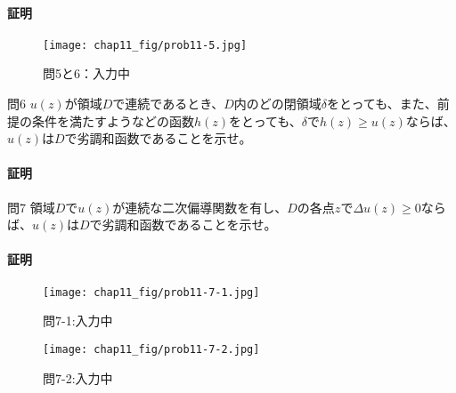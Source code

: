 \paragraph{証明}
\begin{figure}[h]
    \centering
    \texttt{[image: chap11\_fig/prob11-5.jpg]}
    \caption{問5と6：入力中}
    \label{fig:chap11_5}
\end{figure}

\newpage
\begin{mysimplebox}{問6}
    $u(z)$が領域$D$で連続であるとき、$D$内のどの閉領域$\delta$をとっても、また、前提の条件を満たすようなどの函数$h(z)$をとっても、$\delta$で$h(z)\ge u(z)$ならば、$u(z)$は$D$で劣調和函数であることを示せ。
\end{mysimplebox}
\paragraph{証明}

\newpage
\begin{mysimplebox}{問7}
    領域$D$で$u(z)$が連続な二次偏導関数を有し、$D$の各点$z$で$\Delta u(z)\ge0$ならば、$u(z)$は$D$で劣調和函数であることを示せ。
\end{mysimplebox}
\paragraph{証明}
\begin{figure}[h]
    \centering
    \texttt{[image: chap11\_fig/prob11-7-1.jpg]}
    \caption{問7-1:入力中}
    \label{fig:chap11_7-1}
\end{figure}
\begin{figure}[h]
    \centering
    \texttt{[image: chap11\_fig/prob11-7-2.jpg]}
    \caption{問7-2:入力中}
    \label{fig:chap11_7-2}
\end{figure}